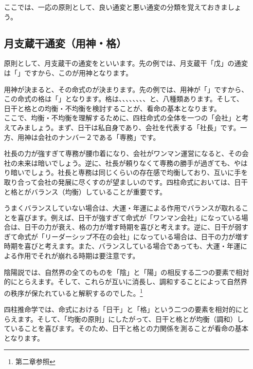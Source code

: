 \documentclass[a5paper,11pt,dvipdfmx]{tarticle}
\begin{document}
ここでは、一応の原則として、良い通変と悪い通変の分類を覚えておきましょう。

\subsection{月支蔵干通変（用神・格）}

原則として、月支蔵干の通変をといいます。先の例では、月支蔵干「戊」の通変は「」ですから、このが用神となります。

用神が決まると、その命式のが決まります。先の例では、用神が「」ですから、この命式の格は「」となります。格は、、、、、、、、と、八種類あります。そして、日干と格との均衡・不均衡を検討することが、看命の基本となります。\\

ここで、均衡・不均衡を理解するために、四柱命式の全体を一つの「会社」と考えてみましょう。まず、日干は私自身であり、会社を代表する「社長」です。一方、用神は会社のナンバー２である「専務」です。

社長の力が強すぎて専務が腰巾着になり、会社がワンマン運営になると、その会社の未来は暗いでしょう。逆に、社長が頼りなくて専務の勝手が過ぎても、やはり暗いでしょう。社長と専務は同じくらいの存在感で均衡しており、互いに手を取り合って会社の発展に尽くすのが望ましいのです。四柱命式においては、日干と格とがバランス（均衡）していることが重要です。

うまくバランスしていない場合は、大運・年運による作用でバランスが取れることを喜びます。例えば、日干が強すぎて命式が「ワンマン会社」になっている場合は、日干の力が衰え、格の力が増す時期を喜びと考えます。逆に、日干が弱すぎて命式が「リーダーシップ不在の会社」になっている場合は、日干の力が増す時期を喜びと考えます。また、バランスしている場合であっても、大運・年運による作用でそれが崩れる時期は要注意です。

陰陽説では、自然界の全てのものを「陰」と「陽」の相反する二つの要素で相対的にとらえます。そして、これらが互いに消長し、調和することによって自然界の秩序が保たれていると解釈するのでした。\footnote{第二章参照}

四柱推命学では、命式における「日干」と「格」という二つの要素を相対的にとらえます。そして、「均衡の原則」にしたがって、日干と格とが均衡（調和）していることを喜びます。そのため、日干と格との力関係を測ることが看命の基本となります。\\
\end{document}
